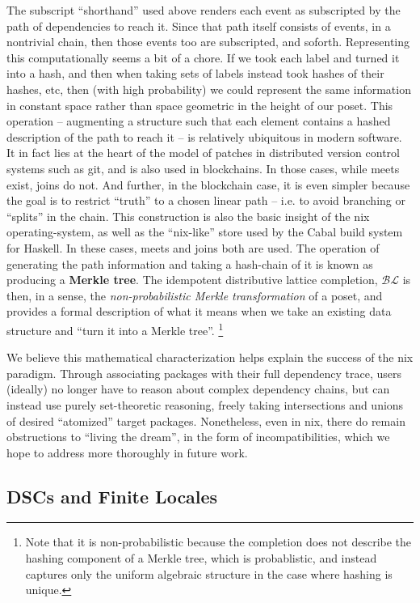 \documentclass[a4paper,USenglish,cleveref, autoref, thm-restate,authorcolumns]{lipics-v2019}
\newcommand{\BLc}{\mathcal{BL}}
\begin{document}
The subscript ``shorthand'' used above renders each event as subscripted by the path of dependencies to reach it. Since that path itself consists of events, in a nontrivial chain, then those events too are subscripted, and soforth. Representing this computationally seems a bit of a chore. If we took each label and turned it into a hash, and then when taking sets of labels instead took hashes of their hashes, etc, then (with high probability) we could represent the same information in constant space rather than space geometric in the height of our poset. This operation -- augmenting a structure such that each element contains a hashed description of the path to reach it -- is relatively ubiquitous in modern software. It in fact lies at the heart of the model of patches in distributed version control systems such as git, and is also used in blockchains. In those cases, while meets exist, joins do not. And further, in the blockchain case, it is even simpler because the goal is to restrict ``truth'' to a chosen linear path -- i.e. to avoid branching or ``splits'' in the chain. This construction is also the basic insight of the nix operating-system, as well as the ``nix-like'' store used by the Cabal build system for Haskell. In these cases, meets and joins both are used. The operation of generating the path information and taking a hash-chain of it is known as producing a \textbf{Merkle tree}\cite{merkle1987digital}. The idempotent distributive lattice completion, \(\BLc\) is then, in a sense,  the \textit{non-probabilistic Merkle transformation} of a poset, and provides a formal description of what it means when we take an existing data structure and ``turn it into a Merkle tree''. \footnote{Note that it is non-probabilistic because the completion does not describe the hashing component of a Merkle tree, which is probablistic, and instead captures only the uniform algebraic structure in the case where hashing is unique.} 

We believe this mathematical characterization helps explain the success of the nix paradigm. Through associating packages with their full dependency trace, users (ideally) no longer have to reason about complex dependency chains, but can instead use purely set-theoretic reasoning, freely taking intersections and unions of desired ``atomized'' target packages. Nonetheless, even in nix, there do remain obstructions to ``living the dream'', in the form of incompatibilities, which we hope to address more thoroughly in future work.

\subsection{DSCs and Finite Locales}
\end{document}
